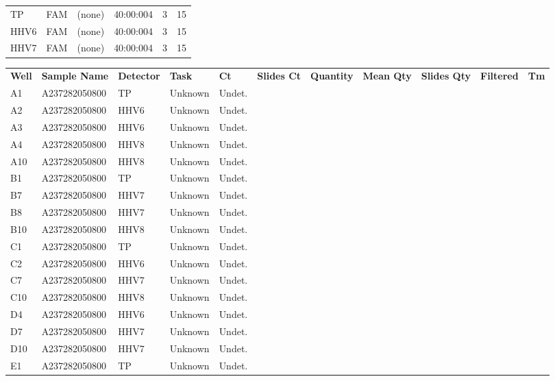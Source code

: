 \documentclass[UTF8,10pt,a4paper,fontset=fandol]{ctexart}
\begin{document}
\begin{center}
\small
\begin{tabular}{llllll}
TP   & FAM & (none) & 40:00:004 & 3 & 15\\
HHV6 & FAM & (none) & 40:00:004 & 3 & 15\\
HHV7 & FAM & (none) & 40:00:004 & 3 & 15
\end{tabular}

\vspace{1em}

\scriptsize
\begin{tabular}{p{0.35in}p{1.55in}p{0.65in}p{0.55in}p{0.38in}p{0.55in}p{0.55in}p{0.55in}p{0.55in}p{0.55in}p{0.35in}}
\textbf{Well} & \textbf{Sample Name} & \textbf{Detector} & \textbf{Task} & \textbf{Ct} & \textbf{Slides Ct} & \textbf{Quantity} & \textbf{Mean Qty} & \textbf{Slides Qty} & \textbf{Filtered} & \textbf{Tm}\\
A1  & A237282050800 & TP   & Unknown & Undet. & & & & & &\\
A2  & A237282050800 & HHV6 & Unknown & Undet. & & & & & &\\
A3  & A237282050800 & HHV6 & Unknown & Undet. & & & & & &\\
A4  & A237282050800 & HHV8 & Unknown & Undet. & & & & & &\\
A10 & A237282050800 & HHV8 & Unknown & Undet. & & & & & &\\[2pt]
B1  & A237282050800 & TP   & Unknown & Undet. & & & & & &\\
B7  & A237282050800 & HHV7 & Unknown & Undet. & & & & & &\\
B8  & A237282050800 & HHV7 & Unknown & Undet. & & & & & &\\
B10 & A237282050800 & HHV8 & Unknown & Undet. & & & & & &\\[2pt]
C1  & A237282050800 & TP   & Unknown & Undet. & & & & & &\\
C2  & A237282050800 & HHV6 & Unknown & Undet. & & & & & &\\
C7  & A237282050800 & HHV7 & Unknown & Undet. & & & & & &\\
C10 & A237282050800 & HHV8 & Unknown & Undet. & & & & & &\\[2pt]
D4  & A237282050800 & HHV6 & Unknown & Undet. & & & & & &\\
D7  & A237282050800 & HHV7 & Unknown & Undet. & & & & & &\\
D10 & A237282050800 & HHV7 & Unknown & Undet. & & & & & &\\
E1  & A237282050800 & TP   & Unknown & Undet. & & & & & &
\end{tabular}
\end{center}
\end{document}
